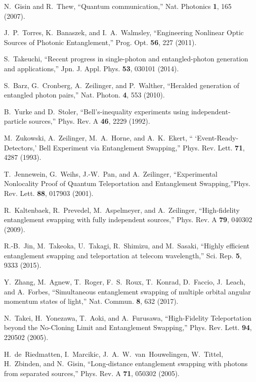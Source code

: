 \documentclass[twocolumn,amssymb, nobibnotes, showpacs, aps, pra,10pt]{revtex4-1}
\begin{document}
\begin{thebibliography}{99}

 N.~Gisin and R.~Thew, ``Quantum communication,'' Nat. Photonics {\bf1}, 165 (2007).

 J.~P.~Torres, K.~Banaszek, and I.~A.~Walmsley, ``Engineering Nonlinear Optic Sources of Photonic Entanglement,'' Prog. Opt. {\bf 56}, 227 (2011).

 S.~Takeuchi, ``Recent progress in single-photon and entangled-photon generation and applications,'' Jpn. J. Appl. Phys. {\bf 53}, 030101 (2014). 

 S.~Barz, G.~Cronberg, A.~Zeilinger, and P.~Walther, ``Heralded generation of entangled photon pairs,'' Nat. Photon. {\bf 4}, 553 (2010).

 B.~Yurke and D.~Stoler, ``Bell's-inequality experiments using independent-particle sources,'' Phys. Rev. A {\bf 46}, 2229 (1992).

 M.~Zukowski, A.~Zeilinger, M.~A.~Horne, and A.~K.~Ekert, `` `Event-Ready-Detectors,' Bell Experiment via Entanglement Swapping,'' Phys. Rev. Lett. {\bf 71}, 4287 (1993).

 T.~Jennewein, G.~Weihs, J.-W.~Pan, and A.~Zeilinger, ``Experimental Nonlocality Proof of Quantum Teleportation and Entanglement Swapping,''Phys. Rev. Lett. {\bf 88}, 017903 (2001).

 R.~Kaltenbaek, R.~Prevedel, M.~Aspelmeyer, and A.~Zeilinger, ``High-fidelity entanglement swapping with fully independent sources,'' Phys. Rev. A {\bf 79}, 040302 (2009).

 R.-B.~Jin, M.~Takeoka, U.~Takagi, R.~Shimizu, and M.~Sasaki, ``Highly efficient entanglement swapping and teleportation at telecom wavelength,'' Sci. Rep. {\bf 5}, 9333 (2015).

 Y.~Zhang, M.~Agnew, T.~Roger, F.~S.~Roux, T.~Konrad, D.~Faccio, J.~Leach, and A.~Forbes, ``Simultaneous entanglement swapping of multiple orbital angular momentum states of light,'' Nat. Commun. {\bf 8}, 632 (2017).

N.~Takei, H.~Yonezawa, T.~Aoki, and A.~Furusawa, ``High-Fidelity Teleportation beyond the No-Cloning Limit and Entanglement Swapping,'' Phys. Rev. Lett. {\bf 94}, 220502 (2005).

 H.~de~Riedmatten, I.~Marcikic, J.~A.~W.~van~Houwelingen, W.~Tittel, H.~Zbinden, and N.~Gisin, ``Long-distance entanglement swapping with photons from separated sources,'' Phys. Rev. A  {\bf 71}, 050302 (2005).


\end{thebibliography}
\end{document}
